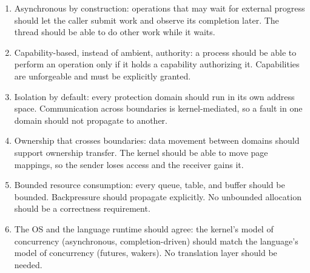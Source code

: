 \begin{enumerate}
    \item Asynchronous by construction: operations that may wait for
        external progress should let the caller submit work and observe its
        completion later. The thread should be able to do other work while it waits.

    \item Capability-based, instead of ambient, authority: a process should be
        able to perform an operation only if it holds a capability authorizing it.
        Capabilities are unforgeable and must be explicitly granted.

    \item Isolation by default: every protection domain should run in its
        own address space. Communication across boundaries is kernel-mediated,
        so a fault in one domain should not propagate to another.

    \item Ownership that crosses boundaries: data movement between
        domains should support ownership transfer. The kernel should be able to
        move page mappings, so the sender loses access and the receiver gains it.

    \item Bounded resource consumption: every queue, table, and buffer
        should be bounded. Backpressure should propagate explicitly. No unbounded
        allocation should be a correctness requirement.

    \item The OS and the language runtime should agree: the kernel's model
        of concurrency (asynchronous, completion-driven) should match the
        language's model of concurrency (futures, wakers). No translation layer
        should be needed.
\end{enumerate}

\endinput
